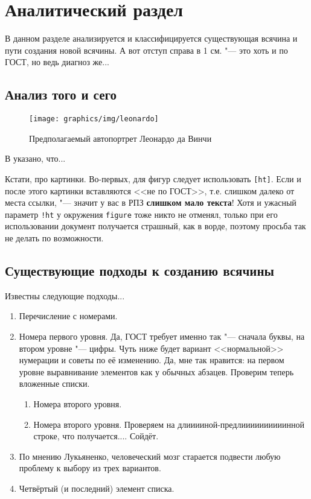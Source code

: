 \chapter{Аналитический раздел}
\label{cha:analysis}
%
%
В данном разделе анализируется и классифицируется существующая всячина и пути создания новой всячины. А вот отступ справа в 1 см. "--- это хоть и по ГОСТ, но ведь диагноз же...

\section{Анализ того и сего}


\begin{figure}
  \centering
  \texttt{[image: graphics/img/leonardo]}
  \caption{Предполагаемый автопортрет Леонардо да Винчи}
  \label{fig:leonardo}
\end{figure}

В \cite{Pup09} указано, что...

Кстати, про картинки. Во-первых, для фигур следует использовать \texttt{[ht]}. Если и после этого картинки вставляются <<не по ГОСТ>>, т.е. слишком далеко от места ссылки, "--- значит у вас в РПЗ \textbf{слишком мало текста}! Хотя и ужасный параметр \texttt{!ht} у окружения \texttt{figure} тоже никто не отменял, только при его использовании документ получается страшный, как в ворде, поэтому просьба так не делать по возможности.

\section{Существующие подходы к созданию всячины}

Известны следующие подходы...

\begin{enumerate}
\item Перечисление с номерами.
\item Номера первого уровня. Да, ГОСТ требует именно так "--- сначала буквы, на втором уровне "--- цифры.
Чуть ниже будет вариант <<нормальной>> нумерации и советы по её изменению.
Да, мне так нравится: на первом уровне выравнивание элементов как у обычных абзацев. Проверим теперь вложенные списки.
\begin{enumerate}
\item Номера второго уровня.
\item Номера второго уровня. Проверяем на длииииной-предлиииииииииинной строке, что получается.... Сойдёт.
\end{enumerate}
\item По мнению Лукьяненко, человеческий мозг старается подвести любую проблему к выбору
  из трех вариантов.
\item Четвёртый (и последний) элемент списка.
\end{enumerate}

